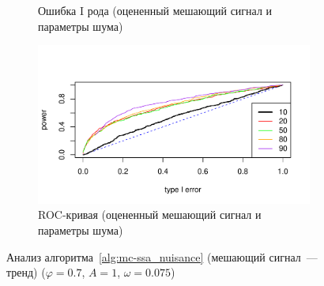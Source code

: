 \documentclass[specialist,
substylefile = spbu_report.rtx,
subf,href,colorlinks=true, 12pt]{disser}
\theoremstyle{definition}
\begin{document}
\begin{figure}[h!]
\begin{subfigure}[t]{0.5\textwidth}
		\caption{Ошибка I рода (оцененный мешающий сигнал и параметры шума)}
		\label{fig:trend_est_noise_signal_type1error}
	\end{subfigure}\hspace{\fill}
	\begin{subfigure}[t]{0.5\textwidth}
		\centering
		\includegraphics[width=\textwidth]{img/roc_trend_est_noise_signal.pdf}
		\caption{ROC-кривая (оцененный мешающий сигнал и параметры шума)}
		\label{fig:trend_est_noise_signal_roc}
	\end{subfigure}
	\caption{Анализ алгоритма~\ref{alg:mc-ssa_nuisance} (мешающий сигнал~--- тренд) ($\varphi=0.7$, $A=1$, $\omega=0.075$)}
\label{fig:trend}
\end{figure}

\end{document}
